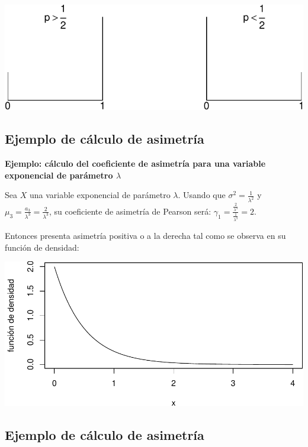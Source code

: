 \documentclass[]{book}
\begin{document}
\includegraphics{curso-probabilidad-udemy_files/figure-latex/unnamed-chunk-104-1.pdf}

\hypertarget{ejemplo-de-cuxe1lculo-de-asimetruxeda-1}{%
\subsection{Ejemplo de cálculo de asimetría}\label{ejemplo-de-cuxe1lculo-de-asimetruxeda-1}}

\textbf{Ejemplo: cálculo del coeficiente de asimetría para una variable exponencial de parámetro \(\lambda\)}

Sea \(X\) una variable exponencial de parámetro \(\lambda\).
Usando que \(\sigma^2=\frac{1}{\lambda^2}\) y \(\mu_3 =\frac{a_3}{\lambda^3}=\frac{2}{\lambda^3}\), su coeficiente de asimetría de Pearson será:
\(\gamma_1 = \frac{\frac{2}{\lambda^3}}{\frac{1}{\lambda^3}}=2.\)

Entonces presenta asimetría positiva o a la derecha tal como se observa en su función de densidad:

\includegraphics{curso-probabilidad-udemy_files/figure-latex/unnamed-chunk-105-1.pdf}

\hypertarget{ejemplo-de-cuxe1lculo-de-asimetruxeda-2}{%
\subsection{Ejemplo de cálculo de asimetría}\label{ejemplo-de-cuxe1lculo-de-asimetruxeda-2}}
\end{document}
